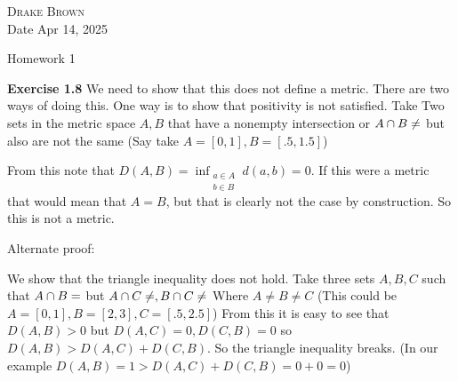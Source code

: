 \documentclass[12pt]{article}
\newenvironment{exercise}[1]{\vspace{.1in}\noindent\textbf{Exercise #1 \hspace{.05em}}}{}
\begin{document}
\DeclarePairedDelimiter\floor{\lfloor}{\rfloor}
\DeclarePairedDelimiter\ceil{\lceil}{\rceil}


\begin{flushright}
	\textsc{Drake Brown}  \\
	Date Apr 14, 2025
\end{flushright}
\begin{center}
	Homework 1
\end{center}

\begin{exercise}{1.8}
	We need to show that this does not define a metric. There are two ways of doing this. One way is to show that positivity is not satisfied. Take Two sets in the metric space $A,B$ that have a nonempty intersection or $A\cap B\neq \empty$ but also are not the same (Say take $A=[0,1],B=[.5,1.5]$)

	From this note that $D(A,B)=\inf_{\substack{a\in A\\b\in B}}d(a,b)=0$. If this were a metric that would mean that $A=B$, but that is clearly not the case by construction. So this is not a metric.

	Alternate proof:

	We show that the triangle inequality does not hold. Take three sets $A,B,C$ such that $A\cap B=\empty$ but $A\cap C\neq \empty, B\cap C\neq \empty$ Where $A\neq B\neq C$ (This could be $A=[0,1],B=[2,3],C=[.5,2.5]$)
	From this it is easy to see that $D(A,B)> 0$ but $D(A,C)=0,D(C,B)=0$ so $D(A,B)> D(A,C)+D(C,B)$. So the triangle inequality breaks. (In our example $D(A,B)=1> D(A,C)+D(C,B)=0+0=0$)
\end{exercise}
\end{document}
